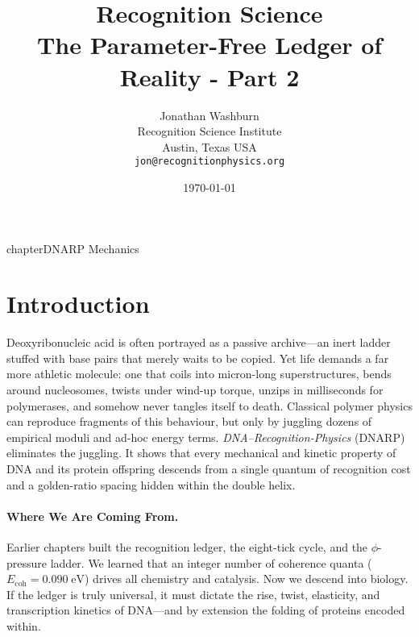 \documentclass[11pt,oneside]{book}
\title{\textbf{Recognition Science}\\[4pt]
       The Parameter-Free Ledger of Reality - Part 2}
\author{Jonathan Washburn\\
        Recognition Science Institute\\
        Austin, Texas USA\\
        \texttt{jon@recognitionphysics.org}}
\date{\today}
\begin{document}
\frontmatter
\onehalfspacing            %
\maketitle

\tableofcontents
\mainmatter

chapter{DNARP Mechanics}
\label{chap:DNARP}

\section*{Introduction}


Deoxyribonucleic acid is often portrayed as a passive archive—an inert
ladder stuffed with base pairs that merely waits to be copied.
Yet life demands a far more athletic molecule:
one that coils into micron-long superstructures, bends around
nucleosomes, twists under wind-up torque, unzips in milliseconds for
polymerases, and somehow never tangles itself to death.
Classical polymer physics can reproduce fragments of this behaviour,
but only by juggling dozens of empirical moduli and ad-hoc energy terms.
\emph{DNA–Recognition-Physics} (DNARP) eliminates the juggling.
It shows that every mechanical and kinetic property of DNA and its
protein offspring descends from a single quantum of recognition cost and
a golden-ratio spacing hidden within the double helix.

\paragraph{Where We Are Coming From.}
Earlier chapters built the recognition ledger, the eight-tick cycle, and
the $\phi$-pressure ladder.
We learned that an integer number of coherence quanta
(\(E_{\text{coh}} = 0.090\;\text{eV}\))
drives all chemistry and catalysis.
Now we descend into biology.
If the ledger is truly universal, it must dictate the rise, twist,
elasticity, and transcription kinetics of DNA—and by extension the
folding of proteins encoded within.
\end{document}

